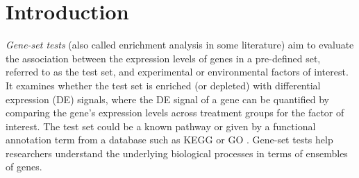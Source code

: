 \documentclass[a4,center,fleqn]{NAR}
\begin{document}
%	
%	
	
	\section{Introduction}\label{section:introduction}
	
\textit{Gene-set tests} (also called enrichment 
analysis in some literature) aim to evaluate  the association between the expression levels of 
genes in a pre-defined set, 
referred to as the test set, and experimental or environmental factors of interest.
It examines whether the test set is enriched (or depleted) with differential expression (DE) 
signals, where the DE signal of a gene can be quantified by comparing the gene's expression 
levels across treatment groups for the factor of interest. The test set could be a known 
pathway or given by a 
functional annotation term from a database such as KEGG \citep{kanehisa2000kegg} or GO 
\citep{ashburner2000gene}.
Gene-set tests help researchers understand the underlying biological processes in terms of 
ensembles of genes.
\end{document}

